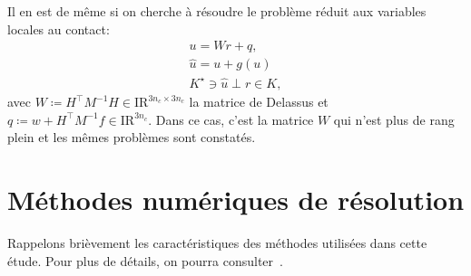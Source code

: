 \documentclass{CSMA2017}
\def\RR{\nbR}
\def\nbR{\ensuremath{\mathrm{I\!R}}} %
\begin{document}
Il en est de même si on cherche à résoudre le problème réduit aux variables locales au contact:
\begin{equation}\label{eq:soccp2-intro}
  \begin{array}{l}
    u = W r + q,  \\
    \hat u = u + g(u) \\
        K^\star \ni {\hat u} \perp r \in K,
  \end{array}
\end{equation}
avec $W \coloneqq H^\top M^{-1} H \in \RR^{3n_c\times 3n_c}$ la matrice de Delassus et $q \coloneqq w + H^\top M^{-1} f \in \RR^{3n_c}$. Dans ce cas, c'est la matrice $W$ qui n'est plus de rang plein et les mêmes problèmes sont constatés.


\section{Méthodes numériques de résolution}
Rappelons brièvement les caractéristiques des méthodes utilisées dans cette étude. Pour plus de détails, on pourra consulter~\cite{Acary.Brogliato2008}.
\end{document}
